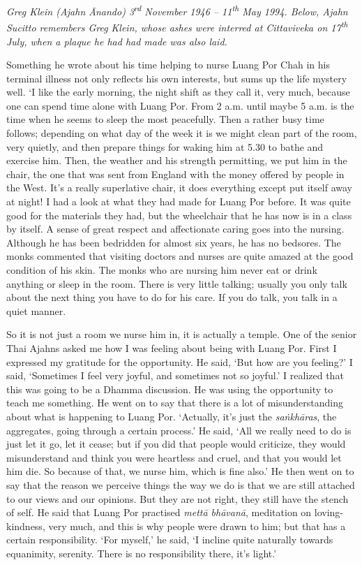 
\emph{Greg Klein (Ajahn Ānando) 3\textsuperscript{rd} November 1946 --
11\textsuperscript{th} May 1994.  Below, Ajahn Sucitto remembers Greg
Klein, whose ashes were interred at Cittaviveka on
17\textsuperscript{th} July, when a plaque he had had made was also
laid.}

Something he wrote about his time helping to nurse Luang Por Chah in his
terminal illness not only reflects his own interests, but sums up the
life mystery well. `I like the early morning, the night shift as they
call it, very much, because one can spend time alone with Luang Por. 
From 2 a.m. until maybe 5 a.m. is the time when he seems to sleep the
most peacefully. Then a rather busy time follows; depending on what day
of the week it is we might clean part of the room, very quietly, and
then prepare things for waking him at 5.30 to bathe and exercise him. 
Then, the weather and his strength permitting, we put him in the chair, 
the one that was sent from England with the money offered by people in
the West. It's a really superlative chair, it does everything except put
itself away at night! I had a look at what they had made for Luang Por
before. It was quite good for the materials they had, but the wheelchair
that he has now is in a class by itself. A sense of great respect and
affectionate caring goes into the nursing. Although he has been
bedridden for almost six years, he has no bedsores. The monks commented
that visiting doctors and nurses are quite amazed at the good condition
of his skin. The monks who are nursing him never eat or drink anything
or sleep in the room. There is very little talking; usually you only
talk about the next thing you have to do for his care. If you do talk, 
you talk in a quiet manner.

So it is not just a room we nurse him in, it is actually a temple. One
of the senior Thai Ajahns asked me how I was feeling about being with
Luang Por. First I expressed my gratitude for the opportunity. He said, 
`But how are you feeling?' I said, `Sometimes I feel very joyful, and
sometimes not so joyful.' I realized that this was going to be a Dhamma
discussion. He was using the opportunity to teach me something. He went
on to say that there is a lot of misunderstanding about what is happening to
Luang Por. `Actually, it's just the \emph{saṅkhāras}, the aggregates, going
through a certain process.' He said, `All we really need to do is just
let it go, let it cease; but if you did that people would criticize, 
they would misunderstand and think you were heartless and cruel, and
that you would let him die. So because of that, we nurse him, which is
fine also.' He then went on to say that the reason we perceive things
the way we do is that we are still attached to our views and our
opinions. But they are not right, they still have the stench of self. He
said that Luang Por practised \emph{mettā bhāvanā}, meditation on
loving-kindness, very much, and this is why people were drawn to him; 
but that has a certain responsibility. `For myself,' he said, `I incline
quite naturally towards equanimity, serenity. There is no responsibility
there, it's light.'

